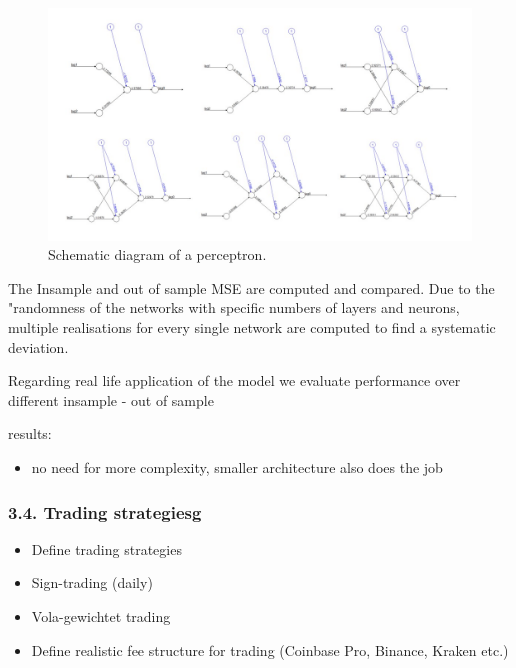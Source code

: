 \documentclass[
]{article}
\providecommand{\tightlist}{%
  \setlength{\itemsep}{0pt}\setlength{\parskip}{0pt}}
\begin{document}
\begin{figure}

{\centering \includegraphics[width=1\linewidth]{images/examples for function} 

}

\caption{Schematic diagram of a perceptron.}\label{fig:examples_for_function}
\end{figure}

The Insample and out of sample MSE are computed and compared. Due to the
"randomness of the networks with specific numbers of layers and neurons,
multiple realisations for every single network are computed to find a
systematic deviation.

Regarding real life application of the model we evaluate performance
over different insample - out of sample

results:

\begin{itemize}
\tightlist
\item
  no need for more complexity, smaller architecture also does the job
\end{itemize}

\hypertarget{trading-strategiesg}{%
\subsubsection{3.4. Trading strategiesg}\label{trading-strategiesg}}

\begin{itemize}
\item
  Define trading strategies
\item
  Sign-trading (daily)
\item
  Vola-gewichtet trading
\item
  Define realistic fee structure for trading (Coinbase Pro, Binance,
  Kraken etc.)
\end{itemize}
\end{document}
